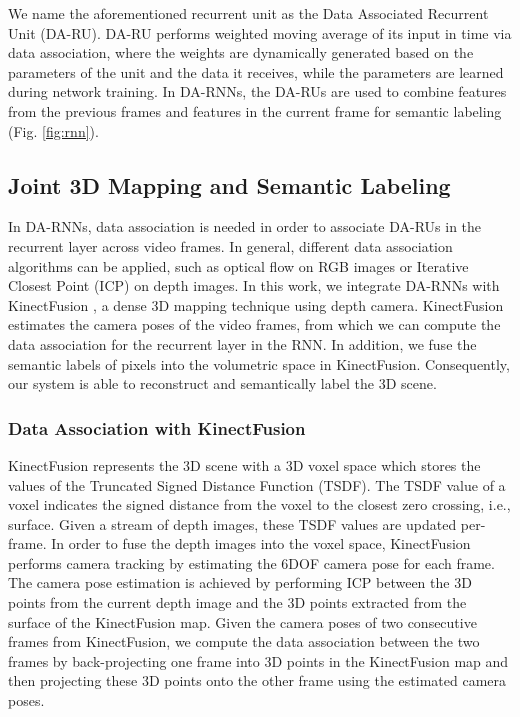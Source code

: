 \documentclass[conference]{IEEEtran}
\begin{document}
We name the aforementioned recurrent unit as the Data Associated Recurrent Unit (DA-RU). DA-RU performs weighted moving average of its input in time via data association, where the weights are dynamically generated based on the parameters of the unit and the data it receives, while the parameters are learned during network training. In DA-RNNs, the DA-RUs are used to combine features from the previous frames and features in the current frame for semantic labeling (Fig. \ref{fig:rnn}).   

\subsection{Joint 3D Mapping and Semantic Labeling}

In DA-RNNs, data association is needed in order to associate DA-RUs in the recurrent layer across video frames. In general, different data association algorithms can be applied, such as optical flow on RGB images or Iterative Closest Point (ICP) on depth images. In this work, we integrate DA-RNNs with KinectFusion \cite{newcombe2011kinectfusion}, a dense 3D mapping technique using depth camera. KinectFusion estimates the camera poses of the video frames, from which we can compute the data association for the recurrent layer in the RNN. In addition, we fuse the semantic labels of pixels into the volumetric space in KinectFusion. Consequently, our system is able to reconstruct and semantically label the 3D scene.

\subsubsection{Data Association with KinectFusion}

KinectFusion represents the 3D scene with a 3D voxel space which stores the values of the Truncated Signed Distance Function (TSDF). The TSDF value of a voxel indicates the signed distance from the voxel to the closest zero crossing, i.e., surface. Given a stream of depth images, these TSDF values are updated per-frame. In order to fuse the depth images into the voxel space, KinectFusion performs camera tracking by estimating the 6DOF camera pose for each frame. The camera pose estimation is achieved by performing ICP between the 3D points from the current depth image and the 3D points extracted from the surface of the KinectFusion map. Given the camera poses of two consecutive frames from KinectFusion, we compute the data association between the two frames by back-projecting one frame into 3D points in the KinectFusion map and then projecting these 3D points onto the other frame using the estimated camera poses.
\end{document}

